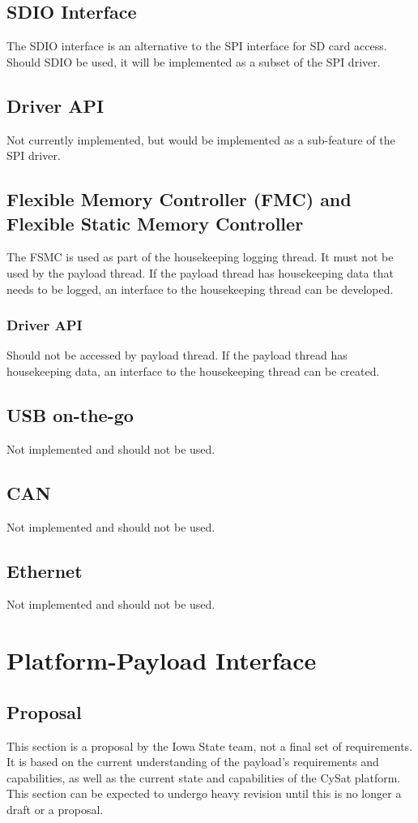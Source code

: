 \documentclass{article}
\begin{document}
\subsection{SDIO Interface}
The SDIO interface is an alternative to the SPI interface for SD card access.
Should SDIO be used, it will be implemented as a subset of the SPI driver.
\subsection{Driver API}
Not currently implemented, but would be implemented as a sub-feature of the 
SPI driver.

\subsection{Flexible Memory Controller (FMC) and Flexible Static Memory Controller}
The FSMC is used as part of the housekeeping logging thread. It must 
not be used by 
the payload thread. If the payload thread has housekeeping data that needs to
be logged,
an interface to the housekeeping thread can be developed.
\subsubsection{Driver API}
Should not be accessed by payload thread. If the payload thread has housekeeping data,
an interface to the housekeeping thread can be created.

\subsection{USB on-the-go}
Not implemented and should not be used.

\subsection{CAN}
Not implemented and should not be used.

\subsection{Ethernet}
Not implemented and should not be used.

\section{Platform-Payload Interface}
\subsection{Proposal}
This section is a proposal by the Iowa State team, not
a final set of requirements. It is based on the current understanding of the
payload's requirements and capabilities, as well as the current state and 
capabilities of the CySat platform. This section can be expected
to undergo heavy revision until this is no longer a draft or
a proposal.
\end{document}
